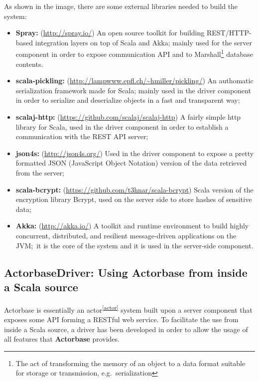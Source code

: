 \documentclass{scalatekids-article}
\begin{document}
As shown in the image, there are some external libraries needed to build the system:
\begin{itemize}
\item \textbf{Spray:} (\url{http://spray.io/}) An open source toolkit for building REST/HTTP-based
  integration layers on top of Scala and Akka; mainly used for the server
  component in order to expose communication API and to
  Marshall\footnote{The act of transforming the memory of an object to a data format suitable
    for storage or transmission, e.g.\ serialization} database contents.
\item \textbf{scala-pickling:} (\url{http://lampwww.epfl.ch/~hmiller/pickling/}) An authomatic serialization framework made for
  Scala; mainly used in the driver component in order to serialize and
  deserialize objects in a fast and transparent way;
\item \textbf{scalaj-http:} (\url{https://github.com/scalaj/scalaj-http}) A fairly simple http library for Scala, used in the
  driver component in order to establish a communication with the REST API server;\
\item \textbf{json4s:} (\url{http://json4s.org/}) Used in the driver component to expose a pretty formatted
  JSON (JavaScript Object Notation) version of the data retrieved from the server;
\item \textbf{scala-bcrypt:} (\url{https://github.com/t3hnar/scala-bcrypt}) Scala version of the encryption library Bcrypt,
  used on the server side to store hashes of sensitive data;
\item \textbf{Akka:} (\url{http://akka.io/}) A toolkit and runtime environment to build highly concurrent,
  distributed, and resilient message-driven applications on the JVM;\ it is the core of
  the system and it is used in the server-side component.
\end{itemize}


\subsection{ActorbaseDriver: Using Actorbase from inside a Scala source}

Actorbase is essentially an actor\textsuperscript{\ref{actor}} system built upon a server component that
exposes some API forming a RESTful web service. To facilitate the use from
inside a Scala source, a driver has been developed in order to allow the
usage of all features that \textbf{Actorbase} provides.\\
\end{document}
